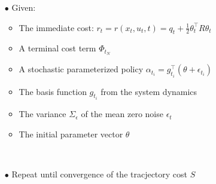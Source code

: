 \documentclass[journal]{IEEEtran}
\begin{document}
\begin{table}
  \caption{}
  \label{table 2}
   \begin{itemize}
     \item[$\bullet$] Given: 
     \begin{itemize}
       
       \item The immediate cost: $r_t = r(x_t,u_t,t) = q_t + \frac{1}{2} \theta_t^{\top} R \theta_t$
       \ \\
       \item A terminal cost term $\Phi_{t_N}$
       \ \\
       \item A stochastic parameterized policy $\alpha_{t_i} = g_{t_i}^{\top} (\theta + \epsilon_{t_i})$
       \ \\
       \item The basis function $g_{t_i}$ from the system dynamics
       \ \\
       \item The variance $\Sigma_{\epsilon}$ of the mean zero noise $\epsilon_t$
       \ \\
       \item The initial parameter vector $\theta$ 
     \end{itemize}  
      \ \\
     \item[$\bullet$] Repeat until convergence of the tracjectory cost $S$
     \begin{itemize}
       

\end{itemize}
\end{itemize}
\end{table}
\end{document}
